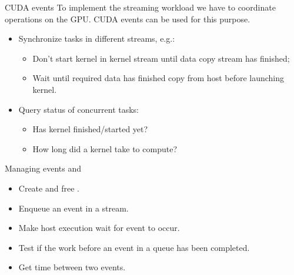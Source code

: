 \documentclass[aspectratio=43]{beamer}
\begin{document}
\begin{frame}[fragile]{CUDA events}
    To implement the streaming workload we have to coordinate operations on the GPU.
    CUDA events can be used for this purpose.
    \begin{itemize}
        \item Synchronize tasks in different streams, e.g.:
        \begin{itemize}
            \item Don't start kernel in kernel stream until data copy stream has finished;
            \item Wait until required data has finished copy from host before launching kernel.
        \end{itemize}
        \item Query status of concurrent tasks:
        \begin{itemize}
            \item Has kernel finished/started yet?
            \item How long did a kernel take to compute?
        \end{itemize}
    \end{itemize}
\end{frame}

\begin{frame}[fragile]{Managing events}
     and 
        \begin{itemize}
            \item Create and free .
        \end{itemize}
        \begin{itemize}
            \item Enqueue an event in a stream.
        \end{itemize}
        \begin{itemize}
            \item Make host execution wait for event to occur.
        \end{itemize}
        \begin{itemize}
            \item Test if the work before an event in a queue has been completed.
        \end{itemize}
        \begin{itemize}
            \item Get time between two events.
        \end{itemize}
\end{frame}
\end{document}
